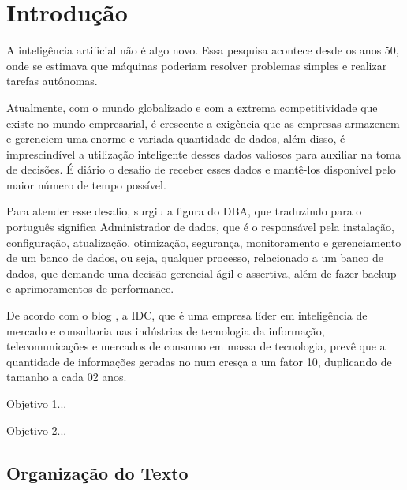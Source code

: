 \chapter{Introdução}

A inteligência artificial não é algo novo. Essa pesquisa acontece desde os anos 50, onde se estimava que máquinas poderiam resolver problemas simples e realizar tarefas autônomas.


Atualmente, com o mundo globalizado e com a extrema competitividade que existe no mundo empresarial, é crescente a exigência que as empresas armazenem e gerenciem uma enorme e variada quantidade de dados, além disso, é imprescindível a utilização inteligente desses dados valiosos para auxiliar na toma de decisões. É diário o desafio de receber esses dados e mantê-los disponível pelo maior número de tempo possível. 


Para atender esse desafio, surgiu a figura do DBA, que traduzindo para o português significa Administrador de dados, que é o responsável pela instalação, configuração, atualização, otimização, segurança, monitoramento e gerenciamento de um banco de dados, ou seja, qualquer processo, relacionado a um banco de dados, que demande uma decisão gerencial ágil e assertiva, além de fazer backup e aprimoramentos de performance.


De acordo com o blog \citet{Castronova2001}, a IDC, que é uma empresa líder em inteligência de mercado e consultoria nas indústrias de tecnologia da informação, telecomunicações e mercados de consumo em massa de tecnologia, prevê que a quantidade de informações geradas no num cresça a um fator 10, duplicando de tamanho a cada 02 anos.

\begin{alineas}
\item Objetivo 1...
\item Objetivo 2...
\end{alineas} 

\section{Organização do Texto}

\lipsum[5-6]

